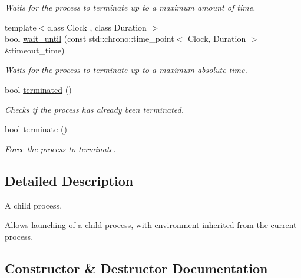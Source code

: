\begin{DoxyCompactItemize}
\begin{DoxyCompactList}\small\item\em Waits for the process to terminate up to a maximum amount of time. \end{DoxyCompactList}\item 
{\footnotesize template$<$class Clock , class Duration $>$ }\\bool \hyperlink{classcpen333_1_1process_1_1posix_1_1subprocess_a10ea54174a30dd26c0d1ff289b88cd42}{wait\+\_\+until} (const std\+::chrono\+::time\+\_\+point$<$ Clock, Duration $>$ \&timeout\+\_\+time)
\begin{DoxyCompactList}\small\item\em Waits for the process to terminate up to a maximum absolute time. \end{DoxyCompactList}\item 
bool \hyperlink{classcpen333_1_1process_1_1posix_1_1subprocess_aabc5ed98ead25bc40663e586a83e62bb}{terminated} ()
\begin{DoxyCompactList}\small\item\em Checks if the process has already been terminated. \end{DoxyCompactList}\item 
bool \hyperlink{classcpen333_1_1process_1_1posix_1_1subprocess_aee0a935ed7052a7622872345bd148ca1}{terminate} ()
\begin{DoxyCompactList}\small\item\em Force the process to terminate. \end{DoxyCompactList}\end{DoxyCompactItemize}


\subsection{Detailed Description}
A child process. 

Allows launching of a child process, with environment inherited from the current process. 

\subsection{Constructor \& Destructor Documentation}
\mbox{\label{classcpen333_1_1process_1_1posix_1_1subprocess_a427822d8d77afa1014a0d10a5f50aa14}} 
